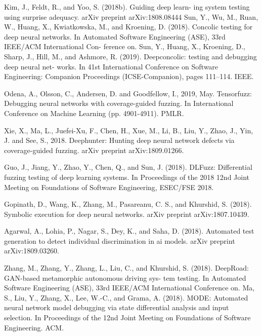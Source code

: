 \begin{singlespace}
\begin{thebibliography}{}
 Kim, J., Feldt, R., and Yoo, S. (2018b). Guiding deep learn- ing system testing using surprise adequacy. arXiv preprint arXiv:1808.08444
 Sun, Y., Wu, M., Ruan, W., Huang, X., Kwiatkowska, M., and Kroening, D. (2018). Concolic testing for deep neural networks. In Automated Software Engineering (ASE), 33rd IEEE/ACM International Con- ference on.
 Sun, Y., Huang, X., Kroening, D., Sharp, J., Hill, M., and Ashmore, R. (2019). Deepconcolic: testing and debugging deep neural net- works. In 41st International Conference on Software Engineering: Companion Proceedings (ICSE-Companion), pages 111–114. IEEE.

 Odena, A., Olsson, C., Andersen, D. and Goodfellow, I., 2019, May. Tensorfuzz: Debugging neural networks with coverage-guided fuzzing. In International Conference on Machine Learning (pp. 4901-4911). PMLR.

Xie, X., Ma, L., Juefei-Xu, F., Chen, H., Xue, M., Li, B., Liu, Y., Zhao, J., Yin, J. and See, S., 2018. Deephunter: Hunting deep neural network defects via coverage-guided fuzzing. arXiv preprint arXiv:1809.01266.

 Guo, J., Jiang, Y., Zhao, Y., Chen, Q., and Sun, J. (2018). DLFuzz: Differential fuzzing testing of deep learning systems. In Proceedings of the 2018 12nd Joint Meeting on Foundations of Software Engineering, ESEC/FSE 2018.

 Gopinath, D., Wang, K., Zhang, M., Pasareanu, C. S., and Khurshid, S. (2018). Symbolic execution for deep neural networks. arXiv preprint arXiv:1807.10439.

 Agarwal, A., Lohia, P., Nagar, S., Dey, K., and Saha, D. (2018). Automated test generation to detect individual discrimination in ai
models. arXiv preprint arXiv:1809.03260.

 Zhang, M., Zhang, Y., Zhang, L., Liu, C., and Khurshid, S. (2018). DeepRoad: GAN-based metamorphic autonomous driving sys- tem testing. In Automated Software Engineering (ASE), 33rd IEEE/ACM International Conference on.
 Ma, S., Liu, Y., Zhang, X., Lee, W.-C., and Grama, A. (2018). MODE: Automated neural network model debugging via state differential analysis and input selection. In Proceedings of the 12nd Joint Meeting on Foundations of Software Engineering. ACM.


\end{thebibliography}
\end{singlespace}
